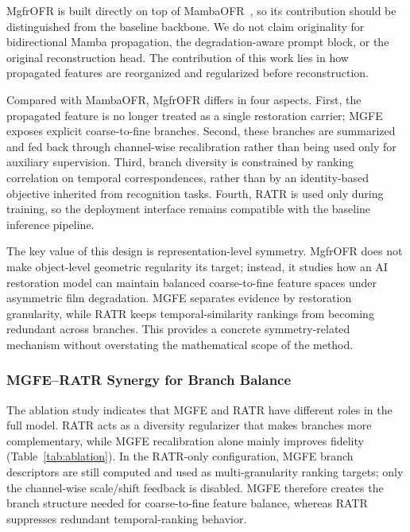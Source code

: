 MgfrOFR is built directly on top of MambaOFR~\cite{mao2025mambaofr}, so its contribution should be distinguished from the baseline backbone. We do not claim originality for bidirectional Mamba propagation, the degradation-aware prompt block, or the original reconstruction head. The contribution of this work lies in how propagated features are reorganized and regularized before reconstruction.

Compared with MambaOFR, MgfrOFR differs in four aspects. First, the propagated feature is no longer treated as a single restoration carrier; MGFE exposes explicit coarse-to-fine branches. Second, these branches are summarized and fed back through channel-wise recalibration rather than being used only for auxiliary supervision. Third, branch diversity is constrained by ranking correlation on temporal correspondences, rather than by an identity-based objective inherited from recognition tasks. Fourth, RATR is used only during training, so the deployment interface remains compatible with the baseline inference pipeline.

The key value of this design is representation-level symmetry. MgfrOFR does not make object-level geometric regularity its target; instead, it studies how an AI restoration model can maintain balanced coarse-to-fine feature spaces under asymmetric film degradation. MGFE separates evidence by restoration granularity, while RATR keeps temporal-similarity rankings from becoming redundant across branches. This provides a concrete symmetry-related mechanism without overstating the mathematical scope of the method.

\subsubsection{MGFE--RATR Synergy for Branch Balance}
\label{subsec:synergy}

The ablation study indicates that MGFE and RATR have different roles in the full model. RATR acts as a diversity regularizer that makes branches more complementary, while MGFE recalibration alone mainly improves fidelity (Table~\ref{tab:ablation}). In the RATR-only configuration, MGFE branch descriptors are still computed and used as multi-granularity ranking targets; only the channel-wise scale/shift feedback is disabled. MGFE therefore creates the branch structure needed for coarse-to-fine feature balance, whereas RATR suppresses redundant temporal-ranking behavior.

